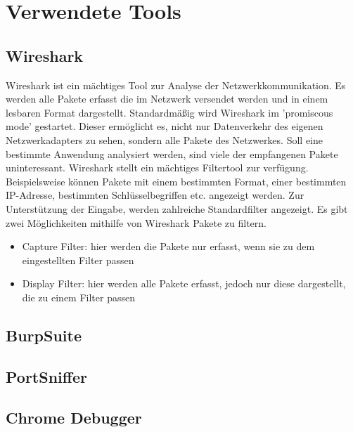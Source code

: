 \section{Verwendete Tools}\label{sec:kaptiel}
\subsection{Wireshark}
\cite{WS1} Wireshark ist ein mächtiges Tool zur Analyse der Netzwerkkommunikation.
Es werden alle Pakete erfasst die im Netzwerk versendet werden und in einem 
lesbaren Format dargestellt. 
Standardmäßig wird Wireshark im 'promiscous mode' gestartet. Dieser ermöglicht
es, nicht nur Datenverkehr des eigenen Netzwerkadapters zu sehen, sondern alle Pakete
des Netzwerkes. 
Soll eine bestimmte Anwendung analysiert werden, sind viele der empfangenen Pakete
uninteressant. Wireshark stellt ein mächtiges Filtertool zur verfügung. 
Beispielsweise können Pakete mit einem bestimmten Format, einer bestimmten IP-Adresse, 
bestimmten Schlüsselbegriffen etc. angezeigt werden. Zur Unterstützung der Eingabe, werden
zahlreiche Standardfilter angezeigt. 
Es gibt zwei Möglichkeiten mithilfe von Wireshark Pakete zu filtern.
\begin{itemize}
    \item Capture Filter: hier werden die Pakete nur erfasst, wenn sie zu dem eingestellten Filter passen
    \item Display Filter: hier werden alle Pakete erfasst, jedoch nur diese dargestellt, die zu einem Filter passen
\end{itemize}


\subsection{BurpSuite}
\subsection{PortSniffer}
\subsection{Chrome Debugger}
